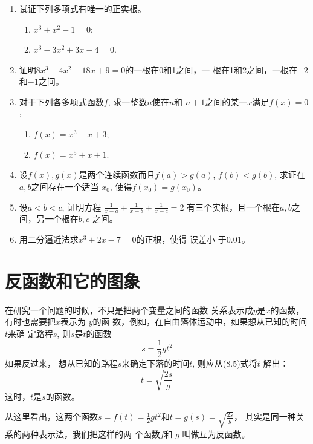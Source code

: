 \begin{enumerate}
\item 试证下列多项式有唯一的正实根。
\begin{multicols}{2}
    \begin{enumerate}
        \item $x^3+x^2-1=0$;
        \item $x^3-3x^2+3x-4=0$.
\end{enumerate}
\end{multicols}
\item 证明$8x^3-4x^2-18x+9=0$的一根在0和1之间，一
根在1和2之间，一根在$-2$和$-1$之间。
\item 对于下列各多项式函数$f$, 求一整数$n$使在$n$和
$n+1$之间的某一$x$满足$f(x)=0$:
\begin{multicols}{2}
    \begin{enumerate}
        \item $f(x)=x^3-x+3$;
        \item  $f(x)=x^5+x+1$.
\end{enumerate}
\end{multicols}
\item 设$f(x),g(x)$是两个连续函数而且$f(a)>
g(a)$, $f(b)<g(b)$, 求证在$a,b$之间存在一个适当
$x_0$, 使得$f(x_0)=g(x_0)$。

\item 设$a<b<c$, 证明方程
$\frac{1}{x-a}+\frac{1}{x-b}+\frac{1}{x-c}=2$
有三个实根，且一个根在$a,b$之间，另一个根在$b,c$
之间。
\item 用二分逼近法求$x^3+2x-7=0$的正根，使得 误差小
于0.01。

\end{enumerate}


\section{反函数和它的图象}

在研究一个问题的时候，不只是把两个变量之间的函数
关系表示成$y$是$x$的函数，有时也需要把$x$表示为 $y$的函
数，例如，在自由落体运动中，如果想从已知的时间$t$来确
定路程$s$, 则$s$是$t$的函数
\begin{equation}
    s=\frac{1}{2}gt^2
\end{equation}
如果反过来，
想从已知的路程$s$来确定下落的时间$t$, 则应从(8.5)式将$t$
解出：
\begin{equation}
    t=\sqrt{\frac{2s}{g}}
\end{equation}
这时，$t$是$s$的函数。

从这里看出，这两个函数$s=f(t)=\frac{1}{2}gt^2$和$t=g(s)=
\sqrt{\frac{2s}{g}}$，
其实是同一种关系的两种表示法，我们把这样的两
个函数$f$和
$g$ 叫做互为反函数。

